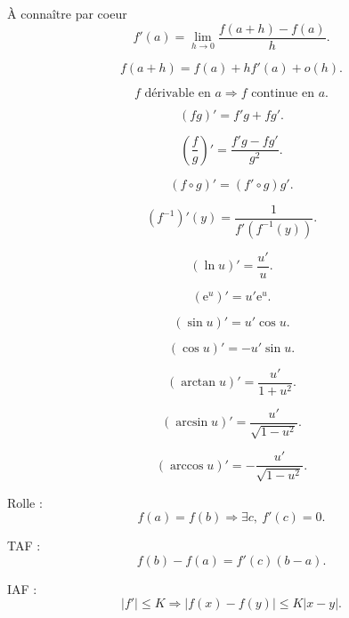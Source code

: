 \documentclass[11pt,a4paper]{article}
\newcommand{\e}{\mathrm{e}}
\begin{document}
\begin{theorembox}{À connaître par coeur}
\[
f'(a)=\lim_{h\to0}\frac{f(a+h)-f(a)}h.
\]

\[
f(a+h)=f(a)+hf'(a)+o(h).
\]

\[
f\text{ dérivable en }a \Longrightarrow f\text{ continue en }a.
\]

\[
(fg)'=f'g+fg'.
\]

\[
\left(\frac fg\right)'=\frac{f'g-fg'}{g^2}.
\]

\[
(f\circ g)'=(f'\circ g)g'.
\]

\[
(f^{-1})'(y)=\frac1{f'(f^{-1}(y))}.
\]

\[
(\ln u)'=\frac{u'}u.
\]

\[
(\e^u)'=u'\e^u.
\]

\[
(\sin u)'=u'\cos u.
\]

\[
(\cos u)'=-u'\sin u.
\]

\[
(\arctan u)'=\frac{u'}{1+u^2}.
\]

\[
(\arcsin u)'=\frac{u'}{\sqrt{1-u^2}}.
\]

\[
(\arccos u)'=-\frac{u'}{\sqrt{1-u^2}}.
\]

Rolle :
\[
f(a)=f(b)\Longrightarrow \exists c,\ f'(c)=0.
\]

TAF :
\[
f(b)-f(a)=f'(c)(b-a).
\]

IAF :
\[
|f'|\leq K\Longrightarrow |f(x)-f(y)|\leq K|x-y|.
\]
\end{theorembox}
\end{document}

